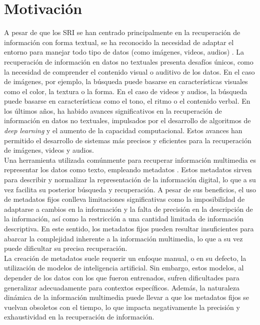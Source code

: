 \section{Motivación}
A pesar de que los SRI se han centrado principalmente en la recuperación de información con forma textual, se ha reconocido la necesidad de adaptar el entorno para manejar todo tipo de datos (como imágenes, videos, audios) \cite{JianMMIR}. La recuperación de información en datos no textuales presenta desafíos únicos, como la necesidad de comprender el contenido visual o auditivo de los datos. En el caso de imágenes, por ejemplo, la búsqueda puede basarse en características visuales como el color, la textura o la forma. En el caso de videos y audios, la búsqueda puede basarse en características como el tono, el ritmo o el contenido verbal. En los últimos años, ha habido avances significativos en la recuperación de información en datos no textuales, impulsados por el desarrollo de algoritmos de \textit{deep learning} y el aumento de la capacidad computacional. %
Estos avances han permitido el desarrollo de sistemas más precisos y eficientes para la recuperación de imágenes, videos y audios.\\
Una herramienta utilizada comúnmente para recuperar información multimedia es representar los datos como texto, empleando metadatos \cite{Doh2022TowardUT}.
Estos metadatos sirven para describir y normalizar la representación de la información digital, lo que a su vez facilita su posterior búsqueda y recuperación. A pesar de sus beneficios, el uso de metadatos fijos conlleva limitaciones significativas como la imposibilidad de adaptarse a cambios en la información y la falta de precisión en la descripción de la información, así como la restricción a una cantidad limitada de información descriptiva. En este sentido, los metadatos fijos pueden resultar insuficientes para abarcar la complejidad inherente a la información multimedia, lo que a su vez puede dificultar su precisa recuperación. \\
La creación de metadatos suele requerir un enfoque manual, o en su defecto, la utilización de modelos de inteligencia artificial. Sin embargo, estos modelos, al depender de los datos con los que fueron entrenados, sufren dificultades para generalizar adecuadamente para contextos específicos. Además, la naturaleza dinámica de la información multimedia puede llevar a que los metadatos fijos se vuelvan obsoletos con el tiempo, lo que impacta negativamente la precisión y exhaustividad en la recuperación de información. \\ %

